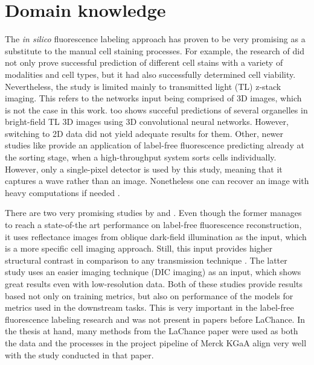 \section{Domain knowledge}

The \textit{in silico} fluorescence labeling approach has proven to be very promising as a substitute to the manual cell staining processes. For example, the research of \cite{Christiansen_2018} did not only prove successful prediction of different cell stains with a variety of modalities and cell types, but it had also successfully determined cell viability. Nevertheless, the study is limited mainly to transmitted light (TL) z-stack imaging. This refers to the networks input being comprised of 3D images, which is not the case in this work. \cite{Ounkomol_2018} too shows succeful predictions of several organelles in bright-field TL 3D images using 3D convolutional neural networks. However, switching to 2D data did not yield adequate results for them. Other, newer studies like \cite{Ugawa_2021} provide an application of label-free fluorescence predicting already at the sorting stage, when a high-throughput system sorts cells individually. However, only a single-pixel detector is used by this study, meaning that it captures a wave rather than an image. Nonetheless one can recover an image with heavy computations if needed \cite{Sadao_2018}.
    
    There are two very promising studies by \cite{Cheng_2021} and \cite{Lachance_2020}. Even though the former manages to reach a state-of-the art performance on label-free fluorescence reconstruction, it uses reflectance images from oblique dark-field illumination as the input, which is a more specific cell imaging approach. Still, this input provides higher structural contrast in comparison to any transmission technique \cite{Boustany_2010}. The latter study uses an easier imaging technique (DIC imaging) as an input, which shows great results even with low-resolution data. Both of these studies provide results based not only on training metrics, but also on performance of the models for metrics used in the downstream tasks. This is very important in the label-free fluorescence labeling research and was not present in papers before LaChance. In the thesis at hand, many methods from the LaChance paper were used as both the data and the processes in the project pipeline of Merck KGaA align very well with the study conducted in that paper.
    
